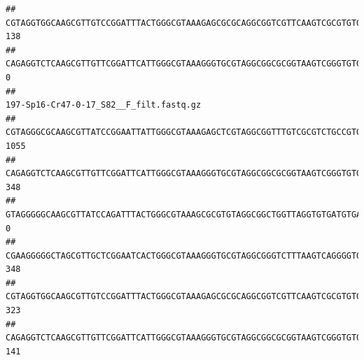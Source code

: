 \documentclass[]{article}
\begin{document}
\begin{verbatim}
## CGTAGGTGGCAAGCGTTGTCCGGATTTACTGGGCGTAAAGAGCGCGCAGGCGGTCGTTCAAGTCGCGTGTGAAAGCCCCCGGCTCAACTGGGGAGGGTCACGCGATACTGATCGACTCGAAGGCAGGAGAGGGTAGTGGAATTCCCGGTGTAGTGGTGAAATGCGTAGATATCGGGAGGAACACCAGTGGCGAAGGCGACTACCTGGCCTGTTCTTGACGCTGAGGCGCGAAAGCTAGGGGAGCAAACG                                     138
## CAGAGGTCTCAAGCGTTGTTCGGATTCATTGGGCGTAAAGGGTGCGTAGGCGGCGCGGTAAGTCGGGTGTGAAATCTCGGGGCTTAACTCCGAAACTGCATTCGATACTGCCGTGCTTGAGGACTGGAGAGGAGACTGGAATTTACGGTGTAGCGGTGAAATGCGTAGATATCGTAAGGAAGACCAGTGGCGAAGGCGGGTCTCTGGACAGTTCCTGACGCTGAGGCACGAAGGCCAGGGGAGCAAACG                                       0
##                                                                                                                                                                                                                                                           197-Sp16-Cr47-0-17_S82__F_filt.fastq.gz
## CGTAGGGCGCAAGCGTTATCCGGAATTATTGGGCGTAAAGAGCTCGTAGGCGGTTTGTCGCGTCTGCCGTGAAAGTCCGGGGCTCAACTCCGGATCTGCGGTGGGTACGGGCAGACTAGAGTGATGTAGGGGAGACTGGAATTCCTGGTGTAGCGGTGAAATGCGCAGATATCAGGAGGAACACCGATGGCGAAGGCAGGTCTCTGGGCATTAACTGACGCTGAGGAGCGAAAGCATGGGGAGCGAACA                                    1055
## CAGAGGTCTCAAGCGTTGTTCGGATTCATTGGGCGTAAAGGGTGCGTAGGCGGCGCGGTAAGTCGGGTGTGAAATCTCGGAGCTTAACTCCGAAACTGCATTCGATACTGCCGTGCTTGAGGACTGGAGAGGAGACTGGAATTTACGGTGTAGCGGTGAAATGCGTAGATATCGTAAGGAAGACCAGTGGCGAAGGCGGGTCTCTGGACAGTTCCTGACGCTGAGGCACGAAGGCCAGGGGAGCAAACG                                     348
## GTAGGGGGCAAGCGTTATCCAGATTTACTGGGCGTAAAGCGCGTGTAGGCGGCTGGTTAGGTGTGATGTGAAATCTTCCGGCTCAACCGGAAAACTGCATTGCAAACCGGCCTGGCTAGAGTGCAGGAGAGGGAAGCGGAATTCCAGGTGTAGCGGTGAAATGCGTAGATATCTGGAGGAACACCAGTGGCGAAGGCGGCTTCCTGGCCTGCAACTGACGCTGAGACGCGAAAGCGTGGGGAGCGAAC                                        0
## CGAAGGGGGCTAGCGTTGCTCGGAATCACTGGGCGTAAAGGGTGCGTAGGCGGGTCTTTAAGTCAGGGGTGAAATCCTGGAGCTCAACTCCAGAACTGCCTTTGATACTGAAGATCTTGAGTTCGGGAGAGGTGAGTGGAACTGCGAGTGTAGAGGTGAAATTCGTAGATATTCGCAAGAACACCAGTGGCGAAGGCGGCTCACTGGCCCGATACTGACGCTGAGGCACGAAAGCGTGGGGAGCAAACA                                     348
## CGTAGGTGGCAAGCGTTGTCCGGATTTACTGGGCGTAAAGAGCGCGCAGGCGGTCGTTCAAGTCGCGTGTGAAAGCCCCCGGCTCAACTGGGGAGGGTCACGCGATACTGATCGACTCGAAGGCAGGAGAGGGTAGTGGAATTCCCGGTGTAGTGGTGAAATGCGTAGATATCGGGAGGAACACCAGTGGCGAAGGCGACTACCTGGCCTGTTCTTGACGCTGAGGCGCGAAAGCTAGGGGAGCAAACG                                     323
## CAGAGGTCTCAAGCGTTGTTCGGATTCATTGGGCGTAAAGGGTGCGTAGGCGGCGCGGTAAGTCGGGTGTGAAATCTCGGGGCTTAACTCCGAAACTGCATTCGATACTGCCGTGCTTGAGGACTGGAGAGGAGACTGGAATTTACGGTGTAGCGGTGAAATGCGTAGATATCGTAAGGAAGACCAGTGGCGAAGGCGGGTCTCTGGACAGTTCCTGACGCTGAGGCACGAAGGCCAGGGGAGCAAACG                                     141

\end{verbatim}
\end{document}
